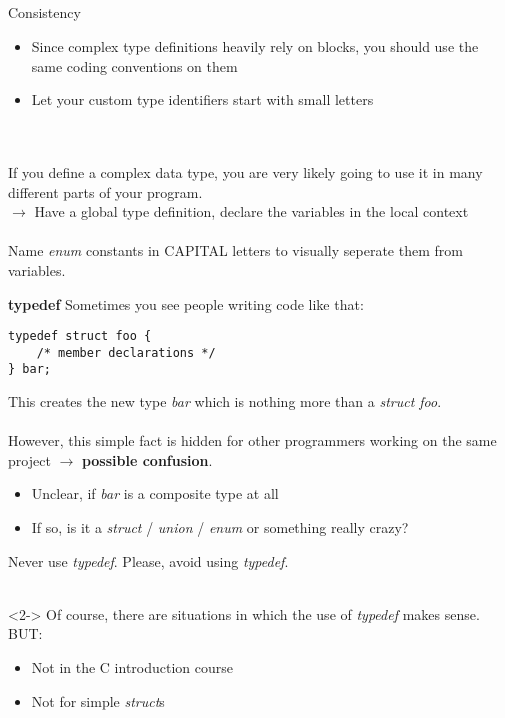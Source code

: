 \subsection{}
\begin{frame}{Consistency}
	\begin{itemize}
		\item Since complex type definitions heavily rely on blocks, you should use the same coding conventions on them
		\item Let your custom type identifiers start with small letters
	\end{itemize} \ \\ \ \\
	If you define a complex data type, you are very likely going to use it in many different parts of your program. \\
	$\rightarrow$ Have a global type definition, declare the variables in the local context \\ \ \\
	Name \textit{enum} constants in CAPITAL letters to visually seperate them from variables.
\end{frame}
\begin{frame}[fragile]{\textbf{typedef}}
	Sometimes you see people writing code like that:
	\begin{lstlisting}[numbers=none]
typedef struct foo {
	/* member declarations */
} bar;
\end{lstlisting}
	This creates the new type \textit{bar} which is nothing more than a \textit{struct foo}. \\ \ \\
	However, this simple fact is hidden for other programmers working on the same project $\rightarrow$ \textbf{possible confusion}.
	\begin{itemize}
		\item Unclear, if \textit{bar} is a composite type at all
		\item If so, is it a \textit{struct} / \textit{union} / \textit{enum} or something really crazy?
	\end{itemize}
\end{frame}
\begin{frame}{Never use \textit{typedef}.}
	\LARGE
	\centering
	Please, avoid using \textit{typedef}.\footnotemark \ \\ \ \\
	\normalsize
	\flushleft
	\begin{uncoverenv}<2->
		Of course, there are situations in which the use of \textit{typedef} makes sense. BUT:
		\begin{itemize}
			\item Not in the C introduction course
			\item Not for simple \textit{struct}s
		\end{itemize}
	\end{uncoverenv}
\end{frame}


